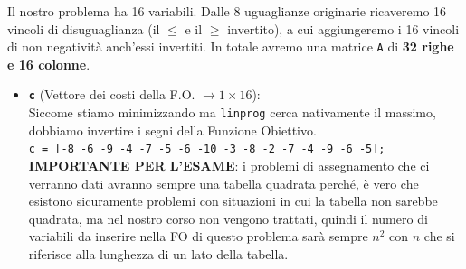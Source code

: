 \documentclass[12pt, a4paper]{article}
\begin{document}
	Il nostro problema ha 16 variabili. Dalle 8 uguaglianze originarie ricaveremo 16 vincoli di disuguaglianza (il $\leq$ e il $\geq$ invertito), a cui aggiungeremo i 16 vincoli di non negatività anch'essi invertiti. In totale avremo una matrice \texttt{A} di \textbf{32 righe e 16 colonne}.
	\begin{itemize}
		\item \textbf{\texttt{c}} (Vettore dei costi della F.O. $\rightarrow 1 \times 16$):\\
		Siccome stiamo minimizzando ma \texttt{linprog} cerca nativamente il massimo, dobbiamo invertire i segni della Funzione Obiettivo.\\
		\texttt{c = [-8 -6 -9 -4 -7 -5 -6 -10 -3 -8 -2 -7 -4 -9 -6 -5];}\\
		\textbf{IMPORTANTE PER L'ESAME}: i problemi di assegnamento che ci verranno dati avranno sempre una tabella quadrata perché, è vero che esistono sicuramente problemi con situazioni in cui la tabella non sarebbe quadrata, ma nel nostro corso non vengono trattati, quindi il numero di variabili da inserire nella FO di questo problema sarà sempre $n^2$ con $n$ che si riferisce alla lunghezza di un lato della tabella.
		

\end{itemize}
\end{document}
